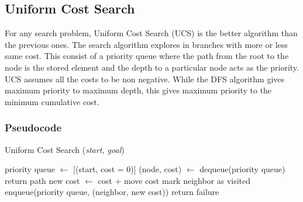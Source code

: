 \subsection{Uniform Cost Search}
\noindent For any search problem, Uniform Cost Search (UCS) is the better algorithm than the previous ones. The search algorithm explores in branches with more or less same cost. This consist of a priority queue where the path from the root to the node is the stored element and the depth to a particular node acts as the priority. UCS assumes all the costs to be non negative. While the DFS algorithm gives maximum priority to maximum depth, this gives maximum priority to the minimum cumulative cost.

\subsubsection{Pseudocode}
\begin{algorithm}[H]
	\caption{Uniform Cost Search (\textit{start, goal})}
	\label{alg:ucs}
	\begin{algorithmic}[1]
		\State priority queue \(\gets\) [(start, cost = 0)]
		\State (node, cost) \(\gets\) dequeue(priority queue)
		\State return path
		\EndIf
		\State new cost \(\gets\) cost + move cost
		\State mark neighbor as visited
		\State enqueue(priority queue, (neighbor, new cost))
		\EndIf
		\EndFor
		\EndWhile
		\State return failure
	\end{algorithmic}
\end{algorithm}

